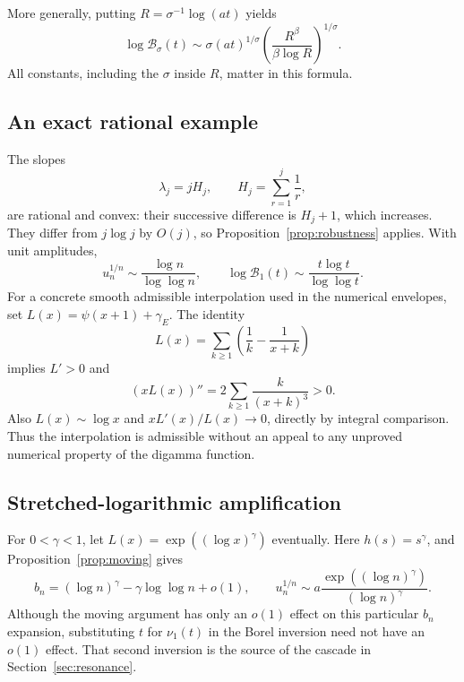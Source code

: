 \documentclass[11pt,a4paper]{article}
\numberwithin{equation}{section}
\theoremstyle{definition}
\theoremstyle{remark}
\newcommand{\Bcal}{\mathcal B}
\begin{document}
More generally, putting $R=\sigma^{-1}\log(at)$ yields
\begin{equation}
 \log\Bcal_\sigma(t)\sim
 \sigma(at)^{1/\sigma}
 \left(\frac{R^\beta}{\beta\log R}\right)^{1/\sigma}.
 \label{eq:log-power-general-borel}
\end{equation}
All constants, including the $\sigma$ inside $R$, matter in this formula.

\subsection{An exact rational example}
The slopes
\begin{equation}
 \lambda_j=jH_j,\qquad H_j=\sum_{r=1}^j\frac1r,
 \label{eq:harmonic-slopes}
\end{equation}
are rational and convex: their successive difference is $H_j+1$,
which increases. They differ from $j\log j$ by $O(j)$, so
Proposition~\ref{prop:robustness} applies. With unit amplitudes,
\begin{equation}
 u_n^{1/n}\sim\frac{\log n}{\log\log n},\qquad
 \log\Bcal_1(t)\sim\frac{t\log t}{\log\log t}.
 \label{eq:harmonic-results}
\end{equation}
For a concrete smooth admissible interpolation used in the numerical
envelopes, set $L(x)=\psi(x+1)+\gamma_{\!E}$. The identity
\[
 L(x)=\sum_{k\ge1}\left(\frac1k-\frac1{x+k}\right)
\]
implies $L'>0$ and
\[
 (xL(x))''=2\sum_{k\ge1}\frac{k}{(x+k)^3}>0.
\]
Also $L(x)\sim\log x$ and $xL'(x)/L(x)\to0$, directly by integral
comparison. Thus the interpolation is admissible without an appeal to
any unproved numerical property of the digamma function.

\subsection{Stretched-logarithmic amplification}
For $0<\gamma<1$, let $L(x)=\exp((\log x)^\gamma)$ eventually.
Here $h(s)=s^\gamma$, and Proposition~\ref{prop:moving} gives
\begin{equation}
 b_n=(\log n)^\gamma-\gamma\log\log n+o(1),\qquad
 u_n^{1/n}\sim a\frac{\exp((\log n)^\gamma)}{(\log n)^\gamma}.
 \label{eq:stretch-root}
\end{equation}
Although the moving argument has only an $o(1)$ effect on this particular
$b_n$ expansion, substituting $t$ for $\nu_1(t)$ in the Borel inversion
need not have an $o(1)$ effect. That second inversion is the source of
the cascade in Section~\ref{sec:resonance}.
\end{document}
